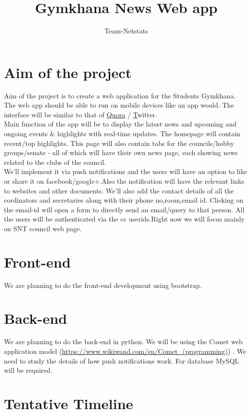 \documentclass{article}
\title{Gymkhana News Web app}
\author{Team-Netstats }
\begin{document}
\maketitle

\section{Aim of the project}
Aim of the project is to create a web application for the Students Gymkhana. The web app should be able to run on mobile devices like an app would. The interface will be similar to that of \href{http://www.quora.com}{Quora} /
\href{http://www.twitter.com}Twitter. \\
Main function of the app will be to display the latest news and upcoming and ongoing events & highlights with real-time updates. The homepage will contain recent/top highlights. This page will also contain tabs for the councils/hobby groups/senate - all of which will have their own news page, each showing news related to the clubs of the council.\\We'll implement it via push notifications and the users will have an option to like or share it on facebook/google+.Also the notification will have the relevant links to websites and other documents. We'll also add the contact details of all the cordinators and secretaries along with their phone no,room,email id. Clicking on the email-id will open a form to directly send an email/query to that person. All the users will be authenticated via the cc userids.Right now we will focus mainly on SNT council web page. \\

\section{Front-end}
We are planning to do the front-end development using bootstrap.

\section{Back-end}
We are planning to do the back-end in python. We will be using the Comet web application model (\url{https://www.wikiwand.com/en/Comet_(programming)}) . We need to study the details of how push notifications work. For database MySQL will be required.

\section{Tentative Timeline}
\end{document}
